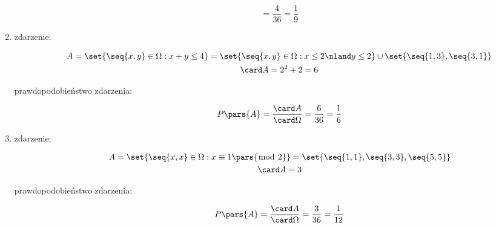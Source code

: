 \begin{enumerate}[label={\alph*)}]
\begin{description}
\begin{equation*}
                        = \frac{4}{36}
                        = \frac{1}{9}
                \end{equation*}
        \end{description}
    \item
        \begin{description}
            \item[zdarzenie:]
                \begin{gather*}
                    A = \set{\seq{x, y} \in \Omega : x + y \leq 4}
                        = \set{\seq{x, y} \in \Omega : x \leq 2 \nland y \leq 2} \cup \set{\seq{1, 3}, \seq{3, 1}}\\
                    \card A = 2^2 + 2
                        = 6
                \end{gather*}
            \item[prawdopodobieństwo zdarzenia:]
                \begin{equation*}
                    P\pars{A}
                        = \frac{\card A}{\card\Omega}
                        = \frac{6}{36}
                        = \frac{1}{6}
                \end{equation*}
        \end{description}
    \item
        \begin{description}
            \item[zdarzenie:]
                \begin{gather*}
                    A = \set{\seq{x, x} \in \Omega : x \equiv 1 \pars{\bmod\ 2}}
                        = \set{\seq{1, 1}, \seq{3, 3}, \seq{5, 5}}\\
                    \card A = 3
                \end{gather*}
            \item[prawdopodobieństwo zdarzenia:]
                \begin{equation*}
                    P\pars{A}
                        = \frac{\card A}{\card\Omega}
                        = \frac{3}{36}
                        = \frac{1}{12}
                \end{equation*}
        \end{description}
\end{enumerate}
